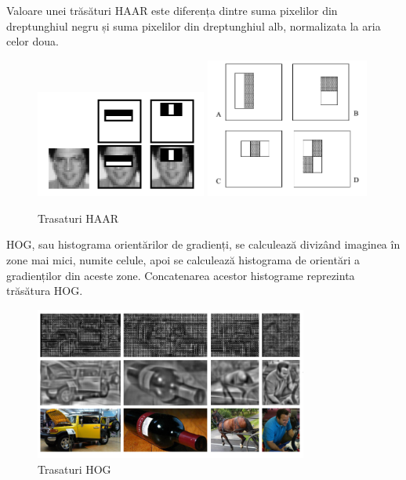Valoare unei trăsături HAAR este diferența dintre suma pixelilor din dreptunghiul negru și suma pixelilor din dreptunghiul alb, normalizata la aria celor doua.
\begin{figure}[H]
	\centering
		\includegraphics[width=0.50\textwidth]{imagini/haar0.png}
		\includegraphics[width=0.48\textwidth]{imagini/haar1.png}
	\caption{Trasaturi HAAR\protect\footnotemark}
	\label{fig:haarfeatures}
\end{figure}

HOG, sau histograma orientărilor de gradienți, se calculează divizând imaginea în zone mai mici, numite celule, apoi se calculează histograma de orientări a gradienților din aceste zone. 
Concatenarea acestor histograme reprezinta trăsătura HOG.
\begin{figure}[H]
	\centering
		\includegraphics[width=0.80\textwidth]{imagini/hog0.png}
	\caption{Trasaturi HOG\protect\footnotemark}
	\label{fig:hog0}
\end{figure}

